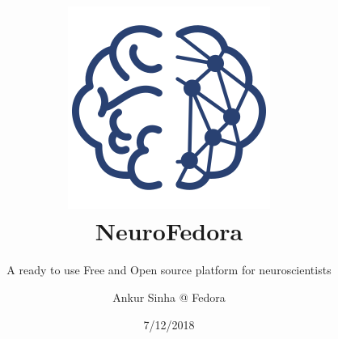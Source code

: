 
\usepackage{color}
\usepackage{tipa}
\usepackage[scale=2]{ccicons}
\usepackage{amssymb}
\usepackage{tikz}
\usetikzlibrary{arrows.meta, arrows}
\usepackage{jneurosci}
\usepackage{subfig}
\usepackage[T1]{fontenc}
\usepackage[utf8]{inputenc}
\usepackage[style=verbose,backend=biber,autocite=footnote]{biblatex}

\usepackage[default,osfigures,scale=0.95]{opensans}
\usepackage[normalem]{ulem}
\usepackage{hyperref}
\hypersetup{colorlinks,linkcolor=Green,urlcolor=links}
\usepackage{graphicx}
\usepackage{algorithmic}
\usepackage{textcomp}
\usepackage{wrapfig}
\usepackage{textgreek}
\usepackage{euler}



\title[NeuroFedora]{\includegraphics[keepaspectratio,width=.25\textwidth]{images/NeuroFedoraLogo01.png}\\NeuroFedora}
\subtitle{A ready to use Free and Open source platform for neuroscientists}
\author[Ankur Sinha]{Ankur Sinha @ Fedora}
\date[7/12/2018]{7/12/2018}



\begin{frame}
  \titlepage{}
\end{frame}

